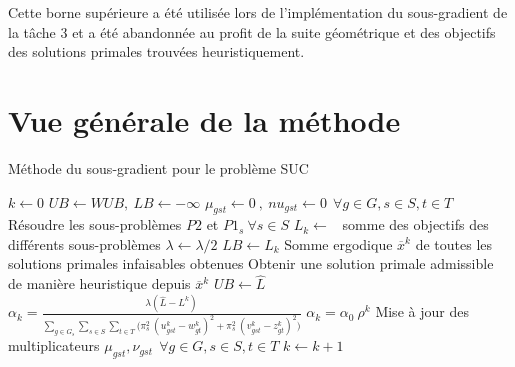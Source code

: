 Cette borne supérieure a été utilisée lors de l'implémentation du sous-gradient de la tâche 3 et a été abandonnée au profit de la suite géométrique et
des objectifs des solutions primales trouvées heuristiquement.

\section{Vue générale de la méthode}

\begin{algorithm}[H]
\caption{Méthode du sous-gradient pour le problème SUC}
\begin{algorithmic}[1]
\State $k \leftarrow 0$
\State $UB \leftarrow WUB, \ LB \leftarrow -\infty$ 
\State $\mu_{gst} \leftarrow 0 \ , \ nu_{gst} \leftarrow 0 \ \ \forall g \in G, s \in S, t \in T$
\State Résoudre les sous-problèmes $P2$ et $P1_s \ \forall s \in S$
\State $L_k \leftarrow $ \ somme des objectifs des différents sous-problèmes
\State $\lambda \leftarrow \lambda / 2$
\EndIf
{}
\State $LB \leftarrow L_k$
\EndIf
{}
\State Somme ergodique $\overline{x}^k$ de toutes les solutions primales infaisables obtenues
\State Obtenir une solution primale admissible de manière heuristique depuis $\overline{x}^k$
\EndIf
{}
\State $UB \leftarrow \hat{L}$
\EndIf
{}
\State $\alpha_k = \frac{\lambda (\hat{L} - L^k)}{\sum\limits_{g \in G_s} \sum\limits_{s \in S} \sum\limits_{t \in T} \big(\pi_s^2 \ (u_{gst}^k - w_{gt}^k)^2 + \pi_s^2 \ (v_{gst}^k - z_{gt}^k)^2\big)}$
\Else
\State $\alpha_k = \alpha_0 \ \rho^k$
\EndIf
\State Mise à jour des multiplicateurs $\mu_{gst}, \nu_{gst} \ \ \forall g \in G, s \in S, t \in T$
\State $k \leftarrow k + 1$
\EndWhile
\EndProcedure
\end{algorithmic}
\end{algorithm}
